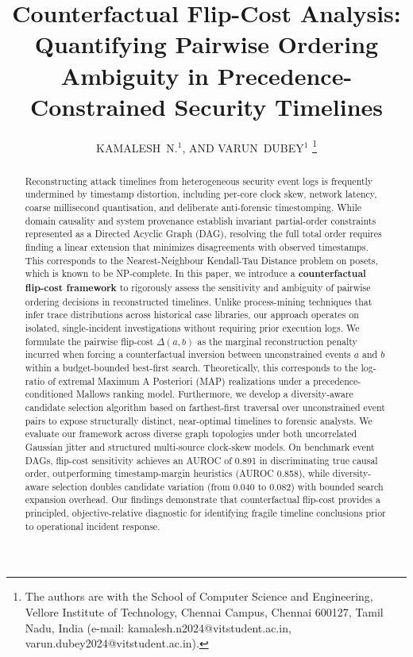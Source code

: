 \documentclass[journal]{IEEEtran}
\begin{document}
\title{Counterfactual Flip-Cost Analysis: Quantifying Pairwise Ordering Ambiguity in Precedence-Constrained Security Timelines}

\author{KAMALESH~N.$^{1}$, AND VARUN~DUBEY$^{1}$%
\thanks{The authors are with the School of Computer Science and Engineering, Vellore Institute of Technology, Chennai Campus, Chennai 600127, Tamil Nadu, India (e-mail: kamalesh.n2024@vitstudent.ac.in, varun.dubey2024@vitstudent.ac.in).}}

\maketitle

\begin{abstract}
Reconstructing attack timelines from heterogeneous security event logs is frequently undermined by timestamp distortion, including per-core clock skew, network latency, coarse millisecond quantisation, and deliberate anti-forensic timestomping. While domain causality and system provenance establish invariant partial-order constraints represented as a Directed Acyclic Graph (DAG), resolving the full total order requires finding a linear extension that minimizes disagreements with observed timestamps. This corresponds to the Nearest-Neighbour Kendall-Tau Distance problem on posets, which is known to be NP-complete. In this paper, we introduce a \textbf{counterfactual flip-cost framework} to rigorously assess the sensitivity and ambiguity of pairwise ordering decisions in reconstructed timelines. Unlike process-mining techniques that infer trace distributions across historical case libraries, our approach operates on isolated, single-incident investigations without requiring prior execution logs. We formulate the pairwise flip-cost $\Delta(a, b)$ as the marginal reconstruction penalty incurred when forcing a counterfactual inversion between unconstrained events $a$ and $b$ within a budget-bounded best-first search. Theoretically, this corresponds to the log-ratio of extremal Maximum A Posteriori (MAP) realizations under a precedence-conditioned Mallows ranking model. Furthermore, we develop a diversity-aware candidate selection algorithm based on farthest-first traversal over unconstrained event pairs to expose structurally distinct, near-optimal timelines to forensic analysts. We evaluate our framework across diverse graph topologies under both uncorrelated Gaussian jitter and structured multi-source clock-skew models. On benchmark event DAGs, flip-cost sensitivity achieves an AUROC of 0.891 in discriminating true causal order, outperforming timestamp-margin heuristics (AUROC 0.858), while diversity-aware selection doubles candidate variation (from 0.040 to 0.082) with bounded search expansion overhead. Our findings demonstrate that counterfactual flip-cost provides a principled, objective-relative diagnostic for identifying fragile timeline conclusions prior to operational incident response.
\end{abstract}
\end{document}
